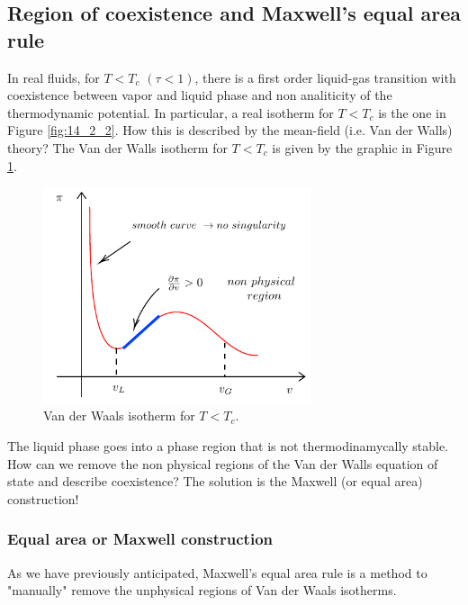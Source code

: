 \documentclass[../../Main/Main.tex]{subfiles}
\begin{document}
\subsection{Region of coexistence and Maxwell's equal area rule}
In real fluids, for \( T < T_c \) \( (\tau < 1) \), there is a first order liquid-gas transition with coexistence between vapor and liquid phase and non analiticity of the thermodynamic potential. In particular, a real isotherm for \( T < T_c \) is the one in Figure \ref{fig:14_2_2}. How this is described by the mean-field (i.e. Van der Walls) theory?
The Van der Walls isotherm for \(T<T_c\) is given by the graphic in Figure \ref{fig:14_3}.
\begin{figure}[H]
\centering
\includegraphics[width=0.7\textwidth]{./img/4.pdf}
\caption{\label{fig:14_3} Van der Waals isotherm for \(T<T_c\).}
\end{figure}
The liquid phase goes into a phase region that is not thermodinamycally stable.
How can we remove the non physical regions of the Van der Walls equation of state and describe coexistence? The solution is the Maxwell (or equal area) construction!


\subsubsection{Equal area or Maxwell construction}
As we have previously anticipated, Maxwell's equal area rule is a method to "manually" remove the unphysical regions of Van der Waals isotherms.
\end{document}

